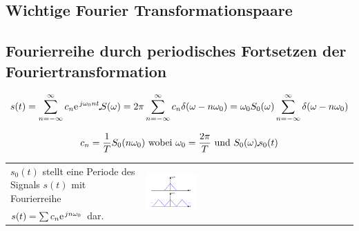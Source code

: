 \subsection{Wichtige Fourier Transformationspaare}

  
  
\subsection{Fourierreihe durch periodisches Fortsetzen der Fouriertransformation}
\[
s(t) = \sum\limits_{n=-\infty}^{\infty} c_n \e^{j\omega_0 n t} \FT S(\omega) = 2\pi \sum\limits_{n=-\infty}^{\infty}c_n \delta(\omega - n\omega_0)
= \omega_0 S_0(\omega) \sum\limits_{n=-\infty}^{\infty} \delta(\omega-n\omega_0)
\] 

\[
c_n = \frac{1}{T}S_0(n\omega_0) \text{ wobei } \omega_0 = \frac{2\pi}{T} \text{ und } S_0(\omega) \IFT s_0(t)
\]

\begin{tabular}{L{9cm}C{9cm}}
$s_0(t)$ stellt eine Periode des Signals $s(t)$ mit Fourierreihe
&  \\
$s(t) = \sum c_n \e^{jn\omega_0}$ dar. & \\
\end{tabular}	

